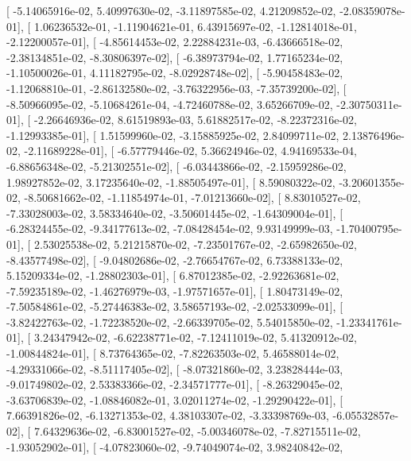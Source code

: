 \documentclass{article}
\begin{document}
       [ -5.14065916e-02,   5.40997630e-02,  -3.11897585e-02,
          4.21209852e-02,  -2.08359078e-01],
       [  1.06236532e-01,  -1.11904621e-01,   6.43915697e-02,
         -1.12814018e-01,  -2.12200057e-01],
       [ -4.85614453e-02,   2.22884231e-03,  -6.43666518e-02,
         -2.38134851e-02,  -8.30806397e-02],
       [ -6.38973794e-02,   1.77165234e-02,  -1.10500026e-01,
          4.11182795e-02,  -8.02928748e-02],
       [ -5.90458483e-02,  -1.12068810e-01,  -2.86132580e-02,
         -3.76322956e-03,  -7.35739200e-02],
       [ -8.50966095e-02,  -5.10684261e-04,  -4.72460788e-02,
          3.65266709e-02,  -2.30750311e-01],
       [ -2.26646936e-02,   8.61519893e-03,   5.61882517e-02,
         -8.22372316e-02,  -1.12993385e-01],
       [  1.51599960e-02,  -3.15885925e-02,   2.84099711e-02,
          2.13876496e-02,  -2.11689228e-01],
       [ -6.57779446e-02,   5.36624946e-02,   4.94169533e-04,
         -6.88656348e-02,  -5.21302551e-02],
       [ -6.03443866e-02,  -2.15959286e-02,   1.98927852e-02,
          3.17235640e-02,  -1.88505497e-01],
       [  8.59080322e-02,  -3.20601355e-02,  -8.50681662e-02,
         -1.11854974e-01,  -7.01213660e-02],
       [  8.83010527e-02,  -7.33028003e-02,   3.58334640e-02,
         -3.50601445e-02,  -1.64309004e-01],
       [ -6.28324455e-02,  -9.34177613e-02,  -7.08428454e-02,
          9.93149999e-03,  -1.70400795e-01],
       [  2.53025538e-02,   5.21215870e-02,  -7.23501767e-02,
         -2.65982650e-02,  -8.43577498e-02],
       [ -9.04802686e-02,  -2.76654767e-02,   6.73388133e-02,
          5.15209334e-02,  -1.28802303e-01],
       [  6.87012385e-02,  -2.92263681e-02,  -7.59235189e-02,
         -1.46276979e-03,  -1.97571657e-01],
       [  1.80473149e-02,  -7.50584861e-02,  -5.27446383e-02,
          3.58657193e-02,  -2.02533099e-01],
       [ -3.82422763e-02,  -1.72238520e-02,  -2.66339705e-02,
          5.54015850e-02,  -1.23341761e-01],
       [  3.24347942e-02,  -6.62238771e-02,  -7.12411019e-02,
          5.41320912e-02,  -1.00844824e-01],
       [  8.73764365e-02,  -7.82263503e-02,   5.46588014e-02,
         -4.29331066e-02,  -8.51117405e-02],
       [ -8.07321860e-02,   3.23828444e-03,  -9.01749802e-02,
          2.53383366e-02,  -2.34571777e-01],
       [ -8.26329045e-02,  -3.63706839e-02,  -1.08846082e-01,
          3.02011274e-02,  -1.29290422e-01],
       [  7.66391826e-02,  -6.13271353e-02,   4.38103307e-02,
         -3.33398769e-03,  -6.05532857e-02],
       [  7.64329636e-02,  -6.83001527e-02,  -5.00346078e-02,
         -7.82715511e-02,  -1.93052902e-01],
       [ -4.07823060e-02,  -9.74049074e-02,   3.98240842e-02,
\end{document}
